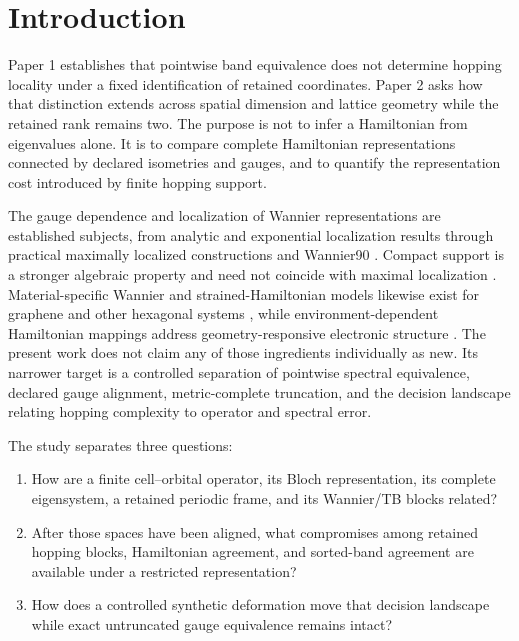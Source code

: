 \documentclass[11pt]{article}
\begin{document}
\section{Introduction}

Paper 1 establishes that pointwise band equivalence does not determine hopping locality
under a fixed identification of retained coordinates. Paper 2 asks how that distinction
extends across spatial dimension and lattice geometry while the retained rank remains
two. The purpose is not to infer a Hamiltonian from eigenvalues alone. It is to compare
complete Hamiltonian representations connected by declared isometries and gauges, and
to quantify the representation cost introduced by finite hopping support.

The gauge dependence and localization of Wannier representations are established
subjects, from analytic and exponential localization results
\cite{Kohn1959AnalyticWannier,Brouder2007ExponentialWannier} through practical
maximally localized constructions and Wannier90
\cite{Mostofi2008Wannier90,Marzari2012MaximallyLocalized}. Compact support is a
stronger algebraic property and need not coincide with maximal localization
\cite{Sathe2024CompactWannier}. Material-specific Wannier and strained-Hamiltonian
models likewise exist for graphene and other hexagonal systems
\cite{Jung2013GrapheneWannier,Fang2018Strained2D}, while environment-dependent
Hamiltonian mappings address geometry-responsive electronic structure
\cite{Zhang2022EquivariantHamiltonians}. The present work does not claim any of those
ingredients individually as new. Its narrower target is a controlled separation of
pointwise spectral equivalence, declared gauge alignment, metric-complete truncation,
and the decision landscape relating hopping complexity to operator and spectral error.

The study separates three questions:
\begin{enumerate}
 \item How are a finite cell--orbital operator, its Bloch representation, its complete
       eigensystem, a retained periodic frame, and its Wannier/TB blocks related?
 \item After those spaces have been aligned, what compromises among retained hopping
       blocks, Hamiltonian agreement, and sorted-band agreement are available under a
       restricted representation?
 \item How does a controlled synthetic deformation move that decision landscape while
       exact untruncated gauge equivalence remains intact?
\end{enumerate}
\end{document}
